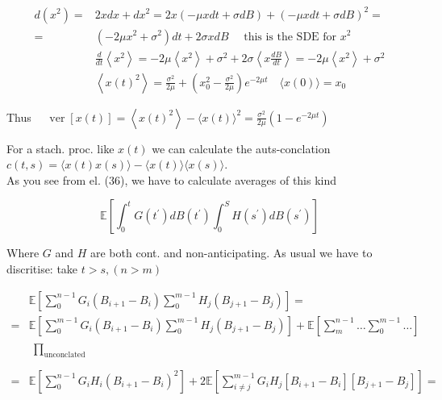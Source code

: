 \documentclass[10pt]{article}
\begin{document}
\begin{align*}
d\left(x^{2}\right)= & 2 x d x+d x^{2}=2 x(-\mu x d t+\sigma d B)+(-\mu x d t+\sigma d B)^{2}= \\
= & \left(-2 \mu x^{2}+\sigma^{2}\right) d t+2 \sigma x d B \quad \text { this is the SDE for } x^{2} \\
& \frac{d}{d t}\left\langle x^{2}\right\rangle=-2 \mu\left\langle x^{2}\right\rangle+\sigma^{2}+2 \sigma\left\langle x \frac{d B}{d t}\right\rangle=-2 \mu\left\langle x^{2}\right\rangle+\sigma^{2} \\
& \left\langle x(t)^{2}\right\rangle=\frac{\sigma^{2}}{2 \mu}+\left(x_{0}^{2}-\frac{\sigma^{2}}{2 \mu}\right) e^{-2 \mu t} \quad\langle x(0)\rangle=x_{0} \tag{37}
\end{align*}


Thus $\quad \operatorname{ver}[x(t)]=\left\langle x(t)^{2}\right\rangle-\langle x(t)\rangle^{2}=\frac{\sigma^{2}}{2 \mu}\left(1-e^{-2 \mu t}\right)$

For a stach. proc. like $x(t)$ we can calculate the auts-conclation $c(t, s)=\langle x(t) x(s)\rangle-\langle x(t)\rangle\langle x(s)\rangle$.\\
As you see from el. (36), we have to calculate averages of this kind


\begin{equation*}
\mathbb{E}\left[\int_{0}^{t} G\left(t^{\prime}\right) d B\left(t^{\prime}\right) \int_{0}^{S} H\left(s^{\prime}\right) d B\left(s^{\prime}\right)\right] \tag{38}
\end{equation*}


Where $G$ and $H$ are both cont. and non-anticipating. As usual we have to discritise: take $t>s,(n>m)$

$$
\begin{aligned}
& \mathbb{E}\left[\sum_{0}^{n-1} G_{i}\left(B_{i+1}-B_{i}\right) \sum_{0}^{m-1} H_{j}\left(B_{j+1}-B_{j}\right)\right]= \\
= & \mathbb{E}\left[\sum_{0}^{m-1} G_{i}\left(B_{i+1}-B_{i}\right) \sum_{0}^{m-1} H_{j}\left(B_{j+1}-B_{j}\right)\right]+\mathbb{E}\left[\sum_{m}^{n-1} \ldots \sum_{0}^{m-1} \ldots\right] \\
& \begin{array}{r}
\prod_{\text {unconclated }} \\
\end{array} \\
= & \mathbb{E}\left[\sum_{0}^{n-1} G_{i} H_{i}\left(B_{i+1}-B_{i}\right)^{2}\right]+2 \mathbb{E}\left[\sum_{i \neq j}^{m-1} G_{i} H_{j}\left[B_{i+1}-B_{i}\right]\left[B_{j+1}-B_{j}\right]\right]=
\end{aligned}
$$
\end{document}
